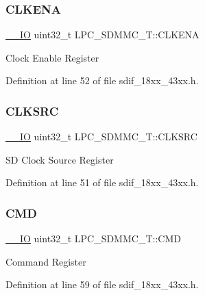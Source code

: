 \subsubsection{\texorpdfstring{C\+L\+K\+E\+NA}{CLKENA}}
{\footnotesize\ttfamily \hyperlink{core__sc300_8h_aec43007d9998a0a0e01faede4133d6be}{\+\_\+\+\_\+\+IO} uint32\+\_\+t L\+P\+C\+\_\+\+S\+D\+M\+M\+C\+\_\+\+T\+::\+C\+L\+K\+E\+NA}

Clock Enable Register 

Definition at line 52 of file sdif\+\_\+18xx\+\_\+43xx.\+h.

\mbox{\label{struct_l_p_c___s_d_m_m_c___t_acee37fc97f323d4690407086a1634e1a}} 
\subsubsection{\texorpdfstring{C\+L\+K\+S\+RC}{CLKSRC}}
{\footnotesize\ttfamily \hyperlink{core__sc300_8h_aec43007d9998a0a0e01faede4133d6be}{\+\_\+\+\_\+\+IO} uint32\+\_\+t L\+P\+C\+\_\+\+S\+D\+M\+M\+C\+\_\+\+T\+::\+C\+L\+K\+S\+RC}

SD Clock Source Register 

Definition at line 51 of file sdif\+\_\+18xx\+\_\+43xx.\+h.

\mbox{\label{struct_l_p_c___s_d_m_m_c___t_a796e22cdf6036df55137c9dcd3cb4c36}} 
\subsubsection{\texorpdfstring{C\+MD}{CMD}}
{\footnotesize\ttfamily \hyperlink{core__sc300_8h_aec43007d9998a0a0e01faede4133d6be}{\+\_\+\+\_\+\+IO} uint32\+\_\+t L\+P\+C\+\_\+\+S\+D\+M\+M\+C\+\_\+\+T\+::\+C\+MD}

Command Register 

Definition at line 59 of file sdif\+\_\+18xx\+\_\+43xx.\+h.

\mbox{\label{struct_l_p_c___s_d_m_m_c___t_a24c0d4af8466eff44d5ae689ac8d4957}} 
